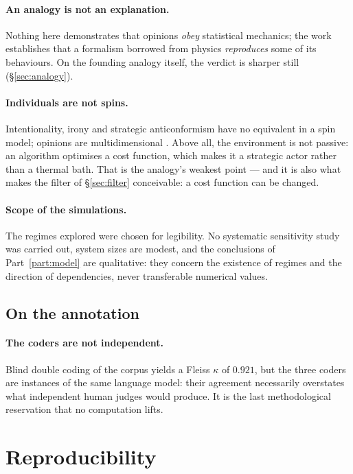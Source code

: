 \documentclass[11pt,a4paper]{article}
\begin{document}
\paragraph{An analogy is not an explanation.} Nothing here demonstrates that opinions
\emph{obey} statistical mechanics; the work establishes that a formalism borrowed from physics
\emph{reproduces} some of its behaviours. On the founding analogy itself, the verdict is
sharper still (\S\ref{sec:analogy}).

\paragraph{Individuals are not spins.} Intentionality, irony and strategic anticonformism have
no equivalent in a spin model; opinions are multidimensional \citep{deffuant2000}. Above all,
the environment is not passive: an algorithm optimises a cost function, which makes it a
strategic actor rather than a thermal bath. That is the analogy's weakest point --- and it is
also what makes the filter of \S\ref{sec:filter} conceivable: a cost function can be changed.

\paragraph{Scope of the simulations.} The regimes explored were chosen for legibility. No
systematic sensitivity study was carried out, system sizes are modest, and the conclusions of
Part~\ref{part:model} are qualitative: they concern the existence of regimes and the direction
of dependencies, never transferable numerical values.

\subsection{On the annotation}

\paragraph{The coders are not independent.} Blind double coding of the corpus yields a Fleiss
$\kappa$ of $0.921$, but the three coders are instances of the same language model: their
agreement necessarily overstates what independent human judges would produce. It is the last
methodological reservation that no computation lifts.

\section{Reproducibility}
\end{document}
